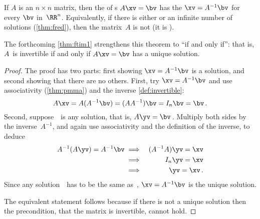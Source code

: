 \begin{theorem} \label{thm:invuniqsol} 
If \(A\) is an  \(n\times n\) matrix, then the  of s \(A\xv=\bv\) has the  \(\xv=A^{-1}\bv\) for every \(\bv\) in~\(\RR^n\).
Equivalently, if there is either  or an infinite number of solutions (\cref{thm:fred}), then the matrix~\(A\) is not  (it is ).
\end{theorem}

The forthcoming \cref{thm:ftim1} strengthens this theorem to ``if and only if'': that is,  \(A\)~is invertible if and only if \(A\xv=\bv\) has a unique solution.


\begin{proof} 
The proof has two parts: first showing \(\xv=A^{-1}\bv\) is a solution, and second showing that there are no others.
First,  try \(\xv=A^{-1}\bv\) and use associativity (\cref{thm:pmma}) and the inverse \cref{def:invertible}:
\begin{equation*}
A\xv=A(A^{-1}\bv)=(AA^{-1})\bv=I_n\bv=\bv\,.
\end{equation*}
Second, suppose~\yv\ is any solution, that is, \(A\yv=\bv\)\,.
Multiply both sides by the inverse~\(A^{-1}\), and again use associativity and the definition of the inverse, to deduce
\begin{eqnarray*}
A^{-1}(A\yv)=A^{-1}\bv
&\implies& (A^{-1}A)\yv=\xv
\\&\implies& I_n\yv=\xv
\\&\implies& \yv=\xv\,.
\end{eqnarray*}
Since any solution~\yv\ has to be the same as~\xv, \(\xv=A^{-1}\bv\) is the unique solution.

The equivalent statement follows because if there is not a unique solution then the precondition, that the matrix is invertible, cannot hold.
\end{proof}





